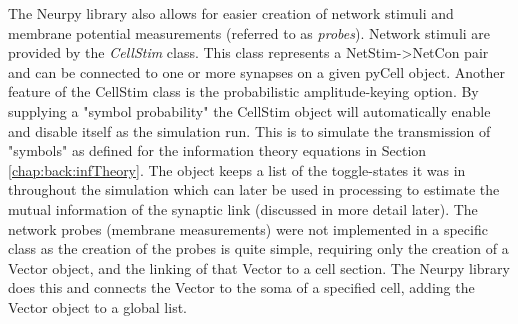 The Neurpy library also allows for easier creation of network stimuli and membrane potential measurements (referred to as \emph{probes}). Network stimuli are provided by the \emph{CellStim} class. This class represents a NetStim->NetCon pair and can be connected to one or more synapses on a given pyCell object. Another feature of the CellStim class is the probabilistic amplitude-keying option. By supplying a "symbol probability" the CellStim object will automatically enable and disable itself as the simulation run. This is to simulate the transmission of "symbols" as defined for the information theory equations in Section \ref{chap:back:infTheory}. The object keeps a list of the toggle-states it was in throughout the simulation which can later be used in processing to estimate the mutual information of the synaptic link (discussed in more detail later). The network probes (membrane measurements) were not implemented in a specific class as the creation of the probes is quite simple, requiring only the creation of a Vector object, and the linking of that Vector to a cell section. The Neurpy library does this and connects the Vector to the soma of a specified cell, adding the Vector object to a global list.\\
